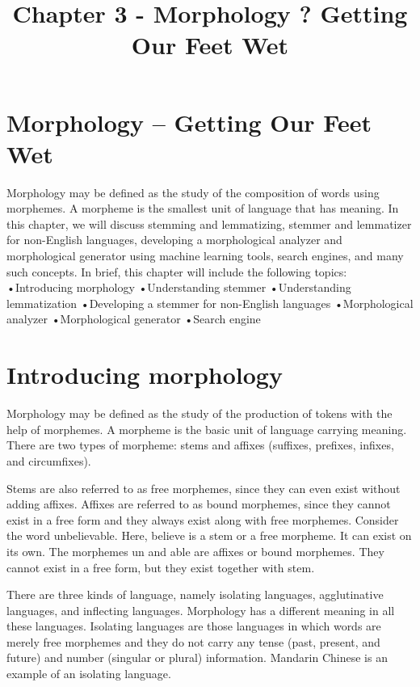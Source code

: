 \documentclass[11pt]{article}
\title{Chapter 3 - Morphology ? Getting Our Feet Wet}
\begin{document}
    
    
    \maketitle
    
    

    
    \hypertarget{morphology-getting-our-feet-wet}{%
\section{Morphology -- Getting Our Feet
Wet}\label{morphology-getting-our-feet-wet}}

    Morphology may be defined as the study of the composition of words using
morphemes. A morpheme is the smallest unit of language that has meaning.
In this chapter, we will discuss stemming and lemmatizing, stemmer and
lemmatizer for non-English languages, developing a morphological
analyzer and morphological generator using machine learning tools,
search engines, and many such concepts.
In brief, this chapter will include the following topics:
•Introducing morphology
•Understanding stemmer
•Understanding lemmatization
•Developing a stemmer for non-English languages
•Morphological analyzer
•Morphological generator
•Search engine
    \hypertarget{introducing-morphology}{%
\section{Introducing morphology}\label{introducing-morphology}}

    Morphology may be defined as the study of the production of tokens with
the help of morphemes. A morpheme is the basic unit of language carrying
meaning. There are two types of morpheme: stems and affixes (suffixes,
prefixes, infixes, and circumfixes).

    Stems are also referred to as free morphemes, since they can even exist
without adding affixes. Affixes are referred to as bound morphemes,
since they cannot exist in a free form and they always exist along with
free morphemes. Consider the word unbelievable. Here, believe is a stem
or a free morpheme. It can exist on its own. The morphemes un and able
are affixes or bound morphemes. They cannot exist in a free form, but
they exist together with stem.

    There are three kinds of language, namely isolating languages,
agglutinative languages, and inflecting languages. Morphology has a
different meaning in all these languages. Isolating languages are those
languages in which words are merely free morphemes and they do not carry
any tense (past, present, and future) and number (singular or plural)
information. Mandarin Chinese is an example of an isolating language.
\end{document}
